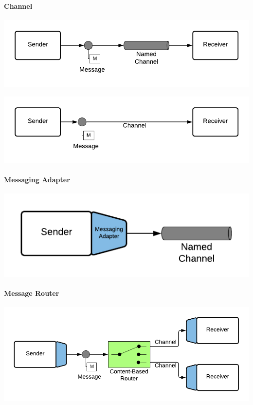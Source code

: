 \paragraph{Channel}

\begin{center}
    \includegraphics[scale=0.6]{Diagrams/Messaging/2. Channel.pdf}
\end{center}

\begin{center}
    \includegraphics[scale=0.6]{Diagrams/Messaging/3. Channel.pdf}
\end{center}

\paragraph{Messaging Adapter}

\begin{center}
    \includegraphics[scale=0.6]{Diagrams/Messaging/4. Messaging Adapter.pdf}
\end{center}

\paragraph{Message Router}

\begin{center}
    \includegraphics[scale=0.6]{Diagrams/Messaging/5. Message Router.pdf}
\end{center}

